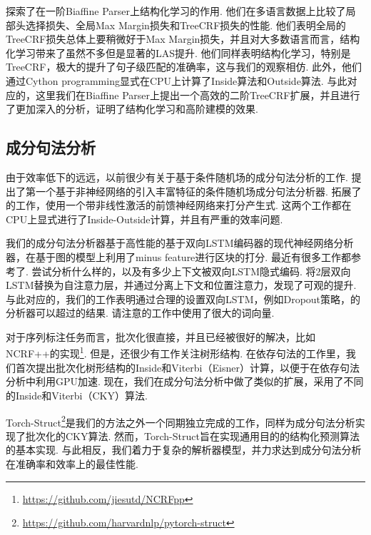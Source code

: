 \citet{zhang-etal-2019-empirical}探索了在一阶Biaffine Parser上结构化学习的作用.
他们在多语言数据上比较了局部头选择损失、全局Max Margin损失和TreeCRF损失的性能.
他们表明全局的TreeCRF损失总体上要稍微好于Max Margin损失，并且对大多数语言而言，结构化学习带来了虽然不多但是显著的LAS提升.
他们同样表明结构化学习，特别是TreeCRF，极大的提升了句子级匹配的准确率，这与我们的观察相仿.
此外，他们通过Cython programming显式在CPU上计算了Inside算法和Outside算法.
与此对应的，这里我们在Biaffine Parser上提出一个高效的二阶TreeCRF扩展，并且进行了更加深入的分析，证明了结构化学习和高阶建模的效果.

\subsection{成分句法分析}

由于效率低下的远远，以前很少有关于基于条件随机场的成分句法分析的工作.
\citet{finkel-etal-2008-efficient}提出了第一个基于非神经网络的引入丰富特征的条件随机场成分句法分析器.
\citet{durrett-klein-2015-neural}拓展了\citet{finkel-etal-2008-efficient}的工作，使用一个带非线性激活的前馈神经网络来打分产生式.
这两个工作都在CPU上显式进行了Inside-Outside计算，并且有严重的效率问题.

我们的成分句法分析器基于高性能的基于双向LSTM编码器\citep{stern-etal-2017-minimal}的现代神经网络分析器，在基于图的模型上利用了minus feature\citep{cross-huang-2016-span}进行区块的打分.
最近有很多工作都参考了\citet{stern-etal-2017-minimal}.
\citet{gaddy-etal-2018-whats}尝试分析什么样的，以及有多少上下文被双向LSTM隐式编码.
\citet{kitaev-klein-2018-constituency}将2层双向LSTM替换为自注意力层，并通过分离上下文和位置注意力，发现了可观的提升.
与此对应的，我们的工作表明通过合理的设置双向LSTM，例如Dropout策略，\citet{stern-etal-2017-minimal}的分析器可以超过\citet{kitaev-klein-2018-constituency}的结果.
请注意\citet{kitaev-klein-2018-constituency}的工作中使用了很大的词向量.

对于序列标注任务而言，批次化很直接，并且已经被很好的解决，比如NCRF++的实现\footnote{\url{https://github.com/jiesutd/NCRFpp}}.
但是，还很少有工作关注树形结构.
在依存句法的工作里，我们首次提出批次化树形结构的Inside和Viterbi（Eisner）计算，以便于在依存句法分析中利用GPU加速\citep{zhang-etal-2020-efficient}.
现在，我们在成分句法分析中做了类似的扩展，采用了不同的Inside和Viterbi（CKY）算法.

Torch-Struct\footnote{\url{https://github.com/harvardnlp/pytorch-struct}}\citep{rush-2020-torch}是我们的方法之外一个同期独立完成的工作，同样为成分句法分析实现了批次化的CKY算法.
然而，Torch-Struct旨在实现通用目的的结构化预测算法的基本实现.
与此相反，我们着力于复杂的解析器模型，并力求达到成分句法分析在准确率和效率上的最佳性能.

